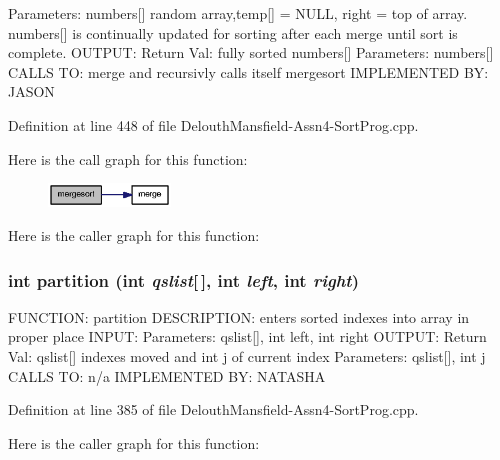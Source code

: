 Parameters: numbers\mbox{[}\mbox{]} random array,temp\mbox{[}\mbox{]} = NULL, right = top of array. numbers\mbox{[}\mbox{]} is continually updated for sorting after each merge until sort is complete. OUTPUT: Return Val: fully sorted numbers\mbox{[}\mbox{]} Parameters: numbers\mbox{[}\mbox{]} CALLS TO: merge and recursivly calls itself mergesort IMPLEMENTED BY: JASON 

Definition at line 448 of file DelouthMansfield-\/Assn4-\/SortProg.cpp.



Here is the call graph for this function:\nopagebreak
\begin{figure}[H]
\begin{center}
\leavevmode
\includegraphics[width=92pt]{_delouth_mansfield-_assn4-_sort_prog_8cpp_a5f5d9f539f726c766f4c454c579f2f6d_cgraph}
\end{center}
\end{figure}




Here is the caller graph for this function:

\hypertarget{_delouth_mansfield-_assn4-_sort_prog_8cpp_af199bb360825bf6dbcb98371c70419e1}{
\subsubsection[{partition}]{\setlength{\rightskip}{0pt plus 5cm}int partition (int {\em qslist}\mbox{[}$\,$\mbox{]}, \/  int {\em left}, \/  int {\em right})}}
\label{_delouth_mansfield-_assn4-_sort_prog_8cpp_af199bb360825bf6dbcb98371c70419e1}
FUNCTION: partition DESCRIPTION: enters sorted indexes into array in proper place INPUT: Parameters: qslist\mbox{[}\mbox{]}, int left, int right OUTPUT: Return Val: qslist\mbox{[}\mbox{]} indexes moved and int j of current index Parameters: qslist\mbox{[}\mbox{]}, int j CALLS TO: n/a IMPLEMENTED BY: NATASHA 

Definition at line 385 of file DelouthMansfield-\/Assn4-\/SortProg.cpp.



Here is the caller graph for this function:

